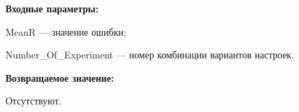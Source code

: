\textbf{Входные параметры:}

MeanR --- значение ошибки;
 
    Number\_Of\_Experiment --- номер комбинации вариантов настроек.

\textbf{Возвращаемое значение:}

Отсутствуют.